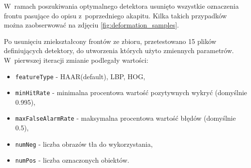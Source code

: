W~ramach poszukiwania optymalnego detektora
usunięto wszystkie oznaczenia frontu pasujące do opisu
z~poprzedniego akapitu. Kilka takich przypadków można
zaobserwować na zdjęciu \ref{fig:deformation_samples}.


Po usunięciu zniekształcony frontów ze zbioru, przetestowano
15 plików definiujących detektory, do utworzenia
których użyto zmiennych parametrów. W~pierwszej iteracji zmianie podlegały
wartości:

\begin{itemize}
\item \verb|featureType| - HAAR(default), LBP, HOG,
\item \verb|minHitRate| - minimalna procentowa wartość pozytywnych wykryć (domyślnie 0.995),
\item \verb|maxFalseAlarmRate| - maksymalna procentowa wartość błędów (domyślnie 0.5),
\item \verb|numNeg| - liczba obrazów tła do wykorzystania,
\item \verb|numPos| - liczba oznaczonych obiektów.
\end{itemize}

